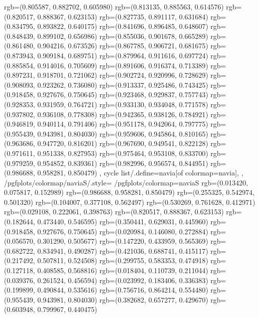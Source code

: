 {{{					rgb=(0.805587, 0.882702, 0.605980)
					rgb=(0.813135, 0.885563, 0.614576)
					rgb=(0.820517, 0.888367, 0.623153)
					rgb=(0.827735, 0.891117, 0.631684)
					rgb=(0.834795, 0.893822, 0.640175)
					rgb=(0.841696, 0.896485, 0.648607)
					rgb=(0.848439, 0.899102, 0.656986)
					rgb=(0.855036, 0.901678, 0.665289)
					rgb=(0.861480, 0.904216, 0.673526)
					rgb=(0.867785, 0.906721, 0.681675)
					rgb=(0.873943, 0.909184, 0.689751)
					rgb=(0.879964, 0.911616, 0.697724)
					rgb=(0.885854, 0.914016, 0.705609)
					rgb=(0.891606, 0.916374, 0.713389)
					rgb=(0.897231, 0.918701, 0.721062)
					rgb=(0.902724, 0.920996, 0.728629)
					rgb=(0.908093, 0.923262, 0.736080)
					rgb=(0.913337, 0.925486, 0.743425)
					rgb=(0.918458, 0.927676, 0.750645)
					rgb=(0.923468, 0.929837, 0.757743)
					rgb=(0.928353, 0.931959, 0.764721)
					rgb=(0.933130, 0.934048, 0.771578)
					rgb=(0.937802, 0.936108, 0.778308)
					rgb=(0.942365, 0.938126, 0.784921)
					rgb=(0.946819, 0.940114, 0.791406)
					rgb=(0.951178, 0.942064, 0.797775)
					rgb=(0.955439, 0.943981, 0.804030)
					rgb=(0.959606, 0.945864, 0.810165)
					rgb=(0.963686, 0.947720, 0.816201)
					rgb=(0.967690, 0.949541, 0.822128)
					rgb=(0.971611, 0.951338, 0.827953)
					rgb=(0.975464, 0.953108, 0.833700)
					rgb=(0.979259, 0.954852, 0.839361)
					rgb=(0.982996, 0.956574, 0.844951)
					rgb=(0.986688, 0.958281, 0.850479)
			},
		cycle list/.define={navia}{[of colormap=navia]},
		},
		/pgfplots/colormap/naviaS/.style={
			/pgfplots/colormap={naviaS}{%
					rgb=(0.013420, 0.075817, 0.152989)
					rgb=(0.986688, 0.958281, 0.850479)
					rgb=(0.255325, 0.542974, 0.501320)
					rgb=(0.104007, 0.377108, 0.562497)
					rgb=(0.530269, 0.761628, 0.412971)
					rgb=(0.029108, 0.222061, 0.398763)
					rgb=(0.820517, 0.888367, 0.623153)
					rgb=(0.182644, 0.473440, 0.546595)
					rgb=(0.350441, 0.629031, 0.445960)
					rgb=(0.918458, 0.927676, 0.750645)
					rgb=(0.020984, 0.146080, 0.272884)
					rgb=(0.056570, 0.301290, 0.505677)
					rgb=(0.147220, 0.433959, 0.565369)
					rgb=(0.682722, 0.834941, 0.490287)
					rgb=(0.421036, 0.688741, 0.415117)
					rgb=(0.217492, 0.507811, 0.524508)
					rgb=(0.299755, 0.583353, 0.474918)
					rgb=(0.127118, 0.408585, 0.568816)
					rgb=(0.018404, 0.110739, 0.211044)
					rgb=(0.039376, 0.261524, 0.456594)
					rgb=(0.023992, 0.183406, 0.336383)
					rgb=(0.199899, 0.490844, 0.535616)
					rgb=(0.756716, 0.864214, 0.554480)
					rgb=(0.955439, 0.943981, 0.804030)
					rgb=(0.382682, 0.657277, 0.429670)
					rgb=(0.603948, 0.799967, 0.440475)
}}}
